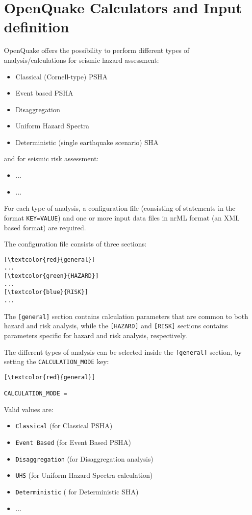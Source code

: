 \section{OpenQuake Calculators and Input definition}
OpenQuake offers the possibility to perform different types of analysis/calculations for seismic hazard assessment:
\begin{itemize}
\item Classical (Cornell-type) PSHA
\item Event based PSHA
\item Disaggregation 
\item Uniform Hazard Spectra 
\item Deterministic (single earthquake scenario) SHA
\end{itemize}

and for seismic risk assessment:
\begin{itemize}
\item ...
\item ...
\end{itemize}

For each type of analysis, a configuration file (consisting of statements in the format \Verb+KEY=VALUE+) and one or more input data files in nrML format (an XML based format) are required.

The configuration file consists of three sections:
\begin{Verbatim}[frame=single, commandchars=\\\{\}, samepage=true]
[\textcolor{red}{general}]
...
[\textcolor{green}{HAZARD}]
...
[\textcolor{blue}{RISK}]
...
\end{Verbatim}
 
The \Verb+[general]+ section contains calculation parameters that are common to both hazard and risk analysis, while the \Verb+[HAZARD]+ and \Verb+[RISK]+ sections contains parameters specific for hazard and risk analysis, respectively.

The different types of analysis can be selected inside the \Verb+[general]+ section, by setting  the \Verb+CALCULATION_MODE+ key:
\begin{Verbatim}[frame=single, commandchars=\\\{\}, samepage=true]
[\textcolor{red}{general}]

CALCULATION_MODE =
\end{Verbatim}

Valid values are: 
\begin{itemize}
\item \Verb+Classical+ (for Classical PSHA)
\item \Verb+Event Based+ (for Event Based PSHA)
\item \Verb+Disaggregation+ (for Disaggregation analysis)
\item \Verb+UHS+ (for Uniform Hazard Spectra calculation)
\item \Verb+Deterministic+ ( for Deterministic SHA)
\item ...
\end{itemize}

